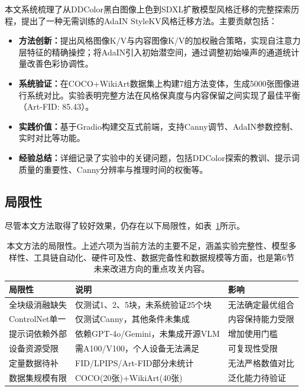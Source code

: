 \documentclass[twocolumn,a4paper,11pt]{ctexart}
\begin{document}
本文系统梳理了从DDColor黑白图像上色到SDXL扩散模型风格迁移的完整探索历程，提出了一种无需训练的AdaIN StyleKV风格迁移方法。主要贡献包括：

\begin{itemize}
  \setlength{\itemsep}{0pt}
\item {\bfseries 方法创新：}提出风格图像K/V与内容图像K/V的加权融合策略，实现自注意力层特征的精确操控；将AdaIN引入初始潜空间，通过调整初始噪声的通道统计量改善色彩协调性。
\item {\bfseries 系统验证：}在COCO+WikiArt数据集上构建7组方法变体，生成5000张图像进行系统对比。实验表明完整方法在风格保真度与内容保留之间实现了最佳平衡（Art-FID: 85.43）。
\item {\bfseries 实践价值：}基于Gradio构建交互式前端，支持Canny调节、AdaIN参数控制、实时对比等功能。
\item {\bfseries 经验总结：}详细记录了实验中的关键问题，包括DDColor探索的教训、提示词质量的重要性、Canny分辨率与推理时间的权衡等。
\end{itemize}

\subsection{局限性}

尽管本文方法取得了较好效果，仍存在以下局限性，如表~\ref{tab:limitations}所示。

\begin{table}[ht]
  \centering
  \caption{本文方法的局限性。上述六项为当前方法的主要不足，涵盖实验完整性、模型多样性、工具链自动化、硬件可及性、数据完备性和数据规模等方面，也是第6节未来改进方向的重点攻关内容。}
  \label{tab:limitations}
  \small
  \setlength{\tabcolsep}{3pt}
  \begin{tabular}{p{2cm}p{3.4cm}p{2.2cm}}
    \toprule
    局限性 & 说明 & 影响 \\
    \midrule
    全块级消融缺失 & 仅测试1、2、5块，未系统验证25个块 & 无法确定最优组合 \\
    ControlNet单一 & 仅测试Canny，其他条件未集成 & 内容保持能力受限 \\
    提示词依赖外部 & 依赖GPT-4o/Gemini，未集成开源VLM & 增加使用门槛 \\
    设备资源受限 & 需A100/V100，个人设备无法满足 & 可复现性受限 \\
    定量数据待补 & FID/LPIPS/Art-FID部分未统计 & 无法严格数值对比 \\
    数据集规模有限 & COCO(20张)+WikiArt(40张) & 泛化能力待验证 \\
    \bottomrule
  \end{tabular}
\end{table}
\end{document}
